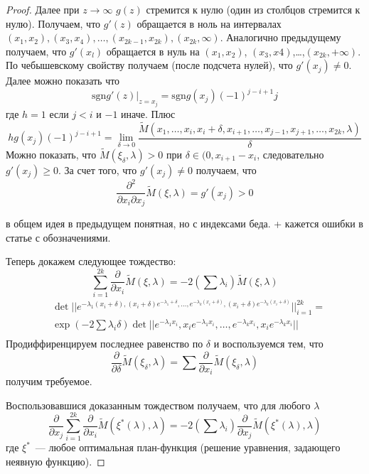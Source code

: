 \begin{proof}
Далее при $z \rightarrow \infty$ $g(z)$ стремится к нулю (один из столбцов стремится к нулю). 
 Получаем, что $g'(z)$ обращается в ноль на интервалах $(x_1, x_2), (x_3, x_4), …, (x_{2k-1}, x_{2k}), (x_{2k}, \infty)$. 
 Аналогично предыдущему получаем, что $g'(x_l)$ обращается в нуль на $(x_1, x_2)$, $(x_3, x4)$,…,$(x_{2k}, +\infty)$. 
 По чебышевскому свойству получаем (после подсчета нулей), что $g'(x_j) \neq 0$. 
Далее можно показать что 
$$\text{sgn} g'(z)|_{z = x_j} = \text{sgn} g(x_j) (-1)^{j-i+1}j$$
где $h = 1$ если $j<i$ и $-1$ иначе.
Плюс 
$$hg(x_j)(-1)^{j-i+1} = \lim\limits_{\delta\rightarrow 0}\frac{\tilde{M}(x_1, …, x_i, x_i + \delta, x_{i+1}, …, x_{j-1}, x_{j+1}, …, x_{2k}, \lambda)}{\delta}$$
Можно показать, что $\tilde{M}(\xi_\delta, \lambda) > 0$ при $\delta\in(0, x_{i+1}-x_{i}$, следовательно $g'(x_j) \geq 0$. За счет того, что $g'(x_j) \neq 0$ получаем, что 
$$\frac{\partial^2}{\partial x_i \partial x_j} \tilde{M}(\xi, \lambda) = g'(x_j) > 0$$

{\color{red} в общем идея в предыдущем понятная, но с индексами беда. + кажется ошибки в статье с обозначениями.}

Теперь докажем следующее тождество:
\begin{equation}
\sum \limits_{i=1}^{2k} \frac{\partial }{\partial x_i} \tilde{M}(\xi, \lambda) = -2 (\sum \lambda_i)\tilde{M}(\xi, \lambda)
\end{equation}
\begin{equation}
\begin{split}
&\det||e^{-\lambda_1(x_i+\delta), (x_i+\delta)e^{-\lambda_1+\delta}, …, e^{-\lambda_k(x_i+\delta)}, (x_i+\delta)e^{-\lambda_k(x_i+\delta)}}||_{i=1}^{2k} = \\
&\exp\left(-2\sum\lambda_i \delta\right) \det||e^{-\lambda_1 x_i}, x_ie^{-\lambda_1 x_i}, …, e^{-\lambda_k x_i},x_ie^{-\lambda_kx_i}||\\ 
\end{split}
\end{equation}
Продиффиренцируем последнее равенство по $\delta$ и воспользуемся тем, что 
$$ 
 \frac{\partial}{\partial \delta} \tilde{M}(\xi_\delta, \lambda)  = \sum \frac{\partial}{\partial x_i} \tilde{M}(\xi_\delta, \lambda)$$
 получим требуемое.

Воспользовавшися доказанным тождеством получаем, что для любого $\lambda$
$$ \frac{\partial}{\partial{x_j}} \sum\limits_{i=1}^{2k} \frac{\partial}{\partial x_i}\tilde{M}(\xi^{*}(\lambda), \lambda) = -2 (\sum\lambda_i)\frac{\partial}{\partial x_j}\tilde{M}(\xi^{*}(\lambda), \lambda)$$
где $\xi^{*}$ — любое оптимальная план-функция (решение уравнения, задающего неявную функцию).


\end{proof}
